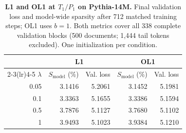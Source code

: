 \begin{table}[!htbp]
\centering
\small
\caption{\textbf{L1 and OL1 at $T_1/P_1$ on Pythia-14M.} Final validation loss and model-wide sparsity after 712 matched training steps; OL1 uses $b=1$. Both metrics cover all 338 complete validation blocks (500 documents; 1,444 tail tokens excluded). One initialization per condition.}
\label{tab:l1-ol1}
\begin{tabular}{r rr rr}
\toprule
 & \multicolumn{2}{c}{L1} & \multicolumn{2}{c}{OL1} \\
\cmidrule(lr){2-3}\cmidrule(lr){4-5}
$\lambda$ & $S_{\mathrm{model}}$ (\%) & Val. loss & $S_{\mathrm{model}}$ (\%) & Val. loss \\
\midrule
0.05 & 3.1416 & 5.2061 & 3.1452 & 5.1981 \\
0.1 & 3.3363 & 5.1655 & 3.3386 & 5.1594 \\
0.5 & 3.7876 & 5.1127 & 3.7680 & 5.1102 \\
1 & 3.9493 & 5.1023 & 3.9384 & 5.1210 \\
\bottomrule
\end{tabular}
\end{table}
